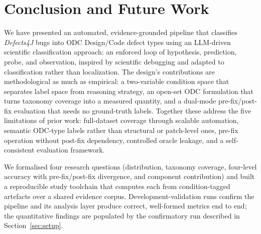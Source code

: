 \section{Conclusion and Future Work}
\label{sec:conclusion}

We have presented an automated, evidence-grounded pipeline that classifies
\textit{Defects4J} bugs into ODC Design/Code defect types using an LLM-driven
scientific classification approach: an enforced loop of hypothesis,
prediction, probe, and observation, inspired by scientific debugging and
adapted to classification rather than localization. The design's contributions are methodological as much
as empirical: a two-variable condition space that separates label space from
reasoning strategy, an open-set ODC formulation that turns taxonomy coverage into
a measured quantity, and a dual-mode pre-fix/post-fix evaluation that needs no
ground-truth labels. Together these address the five limitations of prior work:
full-dataset coverage through scalable automation, semantic ODC-type labels
rather than structural or patch-level ones, pre-fix operation without post-fix
dependency, controlled oracle leakage, and a self-consistent evaluation
framework.

We formalised four research questions (distribution, taxonomy coverage,
four-level accuracy with pre-fix/post-fix divergence, and component contribution)
and built a reproducible study toolchain that computes each from condition-tagged
artefacts over a shared evidence corpus. Development-validation runs confirm the
pipeline and its analysis layer produce correct, well-formed metrics end to end;
the quantitative findings are populated by the confirmatory run described in
Section~\ref{sec:setup}.

